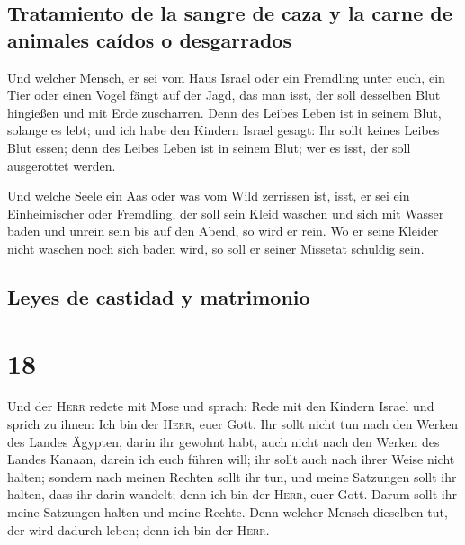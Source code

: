 \hypertarget{tratamiento-de-la-sangre-de-caza-y-la-carne-de-animales-cauxeddos-o-desgarrados}{%
\subsection{Tratamiento de la sangre de caza y la carne de animales
caídos o
desgarrados}\label{tratamiento-de-la-sangre-de-caza-y-la-carne-de-animales-cauxeddos-o-desgarrados}}

 Und welcher Mensch, er sei vom Haus Israel oder ein
Fremdling unter euch, ein Tier oder einen Vogel fängt auf der Jagd, das
man isst, der soll desselben Blut hingießen und mit Erde zuscharren.
 Denn des Leibes Leben ist in seinem Blut, solange es
lebt; und ich habe den Kindern Israel gesagt: Ihr sollt keines Leibes
Blut essen; denn des Leibes Leben ist in seinem Blut; wer es isst, der
soll ausgerottet werden.

 Und welche Seele ein Aas oder was vom Wild zerrissen
ist, isst, er sei ein Einheimischer oder Fremdling, der soll sein Kleid
waschen und sich mit Wasser baden und unrein sein bis auf den Abend, so
wird er rein.  Wo er seine Kleider nicht waschen noch
sich baden wird, so soll er seiner Missetat schuldig sein.

\hypertarget{leyes-de-castidad-y-matrimonio}{%
\subsection{Leyes de castidad y
matrimonio}\label{leyes-de-castidad-y-matrimonio}}

\hypertarget{section-17}{%
\section{18}\label{section-17}}

 Und der \textsc{Herr} redete mit Mose und sprach:
 Rede mit den Kindern Israel und sprich zu ihnen: Ich bin
der \textsc{Herr}, euer Gott.  Ihr sollt nicht tun nach
den Werken des Landes Ägypten, darin ihr gewohnt habt, auch nicht nach
den Werken des Landes Kanaan, darein ich euch führen will; ihr sollt
auch nach ihrer Weise nicht halten;  sondern nach meinen
Rechten sollt ihr tun, und meine Satzungen sollt ihr halten, dass ihr
darin wandelt; denn ich bin der \textsc{Herr}, euer Gott. 
Darum sollt ihr meine Satzungen halten und meine Rechte. Denn welcher
Mensch dieselben tut, der wird dadurch leben; denn ich bin der
\textsc{Herr}.

